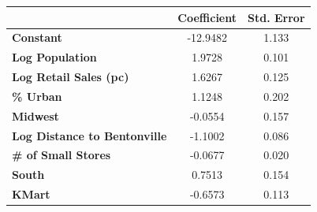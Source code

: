 \begin{center}
\begin{tabular}{lcc}
                                & \textbf{Coefficient} & \textbf{Std. Error}\\
\midrule
\textbf{Constant}                  &     -12.9482  &        1.133    \\
\textbf{Log Population}               &       1.9728  &        0.101    \\
\textbf{Log Retail Sales (pc)} &       1.6267  &        0.125    \\
\textbf{\% Urban}             &       1.1248  &        0.202    \\
\textbf{Midwest}                &      -0.0554  &        0.157    \\
\textbf{Log Distance to Bentonville}      &      -1.1002  &        0.086    \\
\textbf{\# of Small Stores}       &      -0.0677  &        0.020    \\
\textbf{South}                  &       0.7513  &        0.154    \\
\textbf{KMart}                  &      -0.6573  &        0.113    \\
\bottomrule
\end{tabular}
\end{center}
